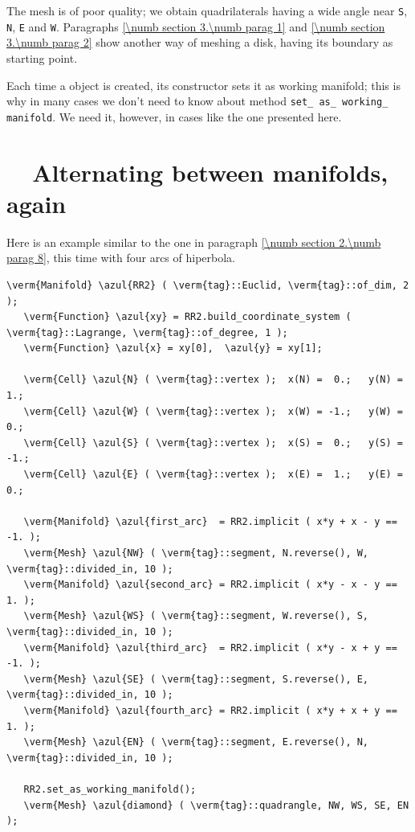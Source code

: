 The mesh is of poor quality; we obtain quadrilaterals having a wide angle near {\small\tt S},
{\small\tt N}, {\small\tt E} and {\small\tt W}.
Paragraphs \ref{\numb section 3.\numb parag 1} and \ref{\numb section 3.\numb parag 2} show
another way of meshing a disk, having its boundary as starting point.

Each time a {\small\tt {}} object is created, its constructor sets it as working manifold;
this is why in many cases we don't need to know about method
{\small\tt set\_\,as\_\,working\_\,manifold}.
We need it, however, in cases like the one presented here.


\section{~~Alternating between manifolds, again}\label{\numb section 2.\numb parag 9}

Here is an example similar to the one in paragraph \ref{\numb section 2.\numb parag 8},
this time with four arcs of hiperbola.

\begin{Verbatim}[commandchars=\\\{\},formatcom=\small\tt,frame=single,
   label=parag-\ref{\numb section 2.\numb parag 9}.cpp,rulecolor=\color{coment},
   baselinestretch=0.94,framesep=2mm]
   \verm{Manifold} \azul{RR2} ( \verm{tag}::Euclid, \verm{tag}::of_dim, 2 );
   \verm{Function} \azul{xy} = RR2.build_coordinate_system ( \verm{tag}::Lagrange, \verm{tag}::of_degree, 1 );
   \verm{Function} \azul{x} = xy[0],  \azul{y} = xy[1];

   \verm{Cell} \azul{N} ( \verm{tag}::vertex );  x(N) =  0.;   y(N) =  1.;
   \verm{Cell} \azul{W} ( \verm{tag}::vertex );  x(W) = -1.;   y(W) =  0.;
   \verm{Cell} \azul{S} ( \verm{tag}::vertex );  x(S) =  0.;   y(S) = -1.;
   \verm{Cell} \azul{E} ( \verm{tag}::vertex );  x(E) =  1.;   y(E) =  0.;

   \verm{Manifold} \azul{first_arc}  = RR2.implicit ( x*y + x - y == -1. );
   \verm{Mesh} \azul{NW} ( \verm{tag}::segment, N.reverse(), W, \verm{tag}::divided_in, 10 );
   \verm{Manifold} \azul{second_arc} = RR2.implicit ( x*y - x - y ==  1. );
   \verm{Mesh} \azul{WS} ( \verm{tag}::segment, W.reverse(), S, \verm{tag}::divided_in, 10 );
   \verm{Manifold} \azul{third_arc}  = RR2.implicit ( x*y - x + y == -1. );
   \verm{Mesh} \azul{SE} ( \verm{tag}::segment, S.reverse(), E, \verm{tag}::divided_in, 10 );
   \verm{Manifold} \azul{fourth_arc} = RR2.implicit ( x*y + x + y ==  1. );
   \verm{Mesh} \azul{EN} ( \verm{tag}::segment, E.reverse(), N, \verm{tag}::divided_in, 10 );
   
   RR2.set_as_working_manifold();
   \verm{Mesh} \azul{diamond} ( \verm{tag}::quadrangle, NW, WS, SE, EN );
\end{Verbatim}

